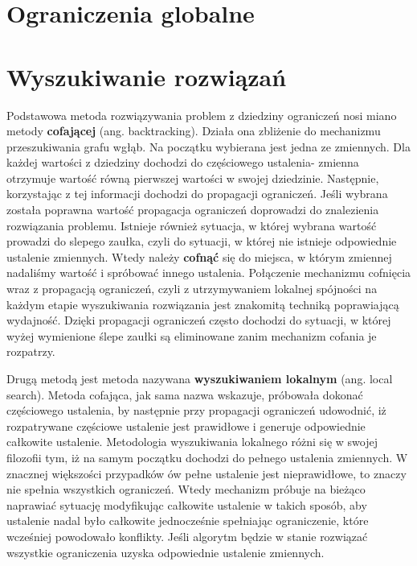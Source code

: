 \section{Ograniczenia globalne}

    
\section{Wyszukiwanie rozwiązań}
    Podstawowa metoda rozwiązywania problem z dziedziny ograniczeń nosi miano metody \textbf{cofającej} (ang. backtracking).
    Działa ona zbliżenie do mechanizmu przeszukiwania grafu wgłąb. Na początku wybierana jest jedna ze zmiennych. Dla każdej wartości 
    z dziedziny dochodzi do częściowego ustalenia- zmienna otrzymuje wartość równą pierwszej wartości w swojej dziedzinie. Następnie, 
    korzystając z tej informacji dochodzi do propagacji ograniczeń. Jeśli wybrana została poprawna wartość propagacja ograniczeń doprowadzi 
    do znalezienia rozwiązania problemu. Istnieje również sytuacja, w której wybrana wartość prowadzi do slepego zaułka, czyli do sytuacji, w której 
    nie istnieje odpowiednie ustalenie zmiennych. Wtedy należy \textbf{cofnąć} 
    się do miejsca, w którym zmiennej nadaliśmy wartość i spróbować innego ustalenia. 
    Połączenie mechanizmu cofnięcia wraz z propagacją ograniczeń, czyli z utrzymywaniem lokalnej spójności na każdym etapie 
    wyszukiwania rozwiązania jest znakomitą techniką poprawiającą wydajność. Dzięki propagacji ograniczeń często 
    dochodzi do sytuacji, w której wyżej wymienione ślepe zaułki są eliminowane zanim mechanizm cofania je rozpatrzy. 
    
    Drugą metodą jest metoda nazywana \textbf{wyszukiwaniem lokalnym} (ang. local search). Metoda cofająca, jak sama nazwa wskazuje, próbowała dokonać 
    częściowego ustalenia, by następnie przy propagacji ograniczeń udowodnić, iż rozpatrywane częściowe ustalenie jest prawidłowe 
    i generuje odpowiednie całkowite ustalenie. Metodologia wyszukiwania lokalnego różni się w swojej filozofii tym, iż na samym 
    początku dochodzi do pełnego ustalenia zmiennych. W znacznej większości przypadków ów pełne ustalenie jest 
    nieprawidłowe, to znaczy nie spełnia wszystkich ograniczeń. Wtedy mechanizm próbuje na bieżąco naprawiać sytuację modyfikując całkowite ustalenie w takich 
    sposób, aby ustalenie nadal było całkowite jednocześnie spełniając ograniczenie, które wcześniej powodowało konflikty. Jeśli algorytm będzie w stanie 
    rozwiązać wszystkie ograniczenia uzyska odpowiednie ustalenie zmiennych.

